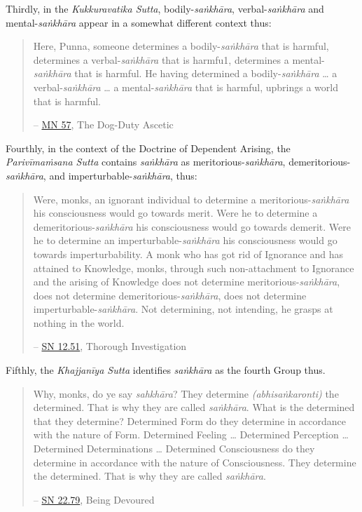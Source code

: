 Thirdly, in the \emph{Kukkuravatika Sutta}, bodily-\emph{saṅkhāra}, verbal-\emph{saṅkhāra} and mental-\emph{saṅkhāra} appear in a somewhat different context thus:

\begin{quote}
Here, Punna, someone determines a bodily-\emph{saṅkhāra} that is harmful, determines a verbal-\emph{saṅkhāra} that is harmfu1, determines a mental-\emph{saṅkhāra} that is harmful. He having determined a bodily-\emph{saṅkhāra} \ldots{} a verbal-\emph{saṅkhāra} \ldots{} a mental-\emph{saṅkhāra} that is harmful, upbrings a world that is harmful.

 -- \href{https://suttacentral.net/mn57/en/bodhi}{MN 57}, The Dog-Duty Ascetic
\end{quote}

Fourthly, in the context of the Doctrine of Dependent Arising, the \emph{Parivīmaṁsana Sutta} contains \emph{saṅkhāra} as meritorious-\emph{saṅkhāra}, demeritorious-\emph{saṅkhāra}, and imperturbable-\emph{saṅkhāra}, thus:

\begin{quote}
Were, monks, an ignorant individual to determine a meritorious-\emph{saṅkhāra} his consciousness would go towards merit. Were he to determine a demeritorious-\emph{saṅkhāra} his consciousness would go towards demerit. Were he to determine an imperturbable-\emph{saṅkhāra} his consciousness would go towards imperturbability. A monk who has got rid of Ignorance and has attained to Knowledge, monks, through such non-attachment to Ignorance and the arising of Knowledge does not determine meritorious-\emph{saṅkhāra}, does not determine demeritorious-\emph{saṅkhāra}, does not determine imperturbable-\emph{saṅkhāra}. Not determining, not intending, he grasps at nothing in the world.

 -- \href{https://suttacentral.net/sn12.51/en/sujato}{SN 12.51}, Thorough Investigation
\end{quote}

Fifthly, the \emph{Khajjanīya Sutta} identifies \emph{saṅkhāra} as the fourth Group thus.

\begin{quote}
Why, monks, do ye say \emph{sahkhāra}? They determine \emph{(abhisaṅkaronti)} the determined. That is why they are called \emph{saṅkhāra}. What is the determined that they determine? Determined Form do they determine in accordance with the nature of Form. Determined Feeling \ldots{} Determined Perception \ldots{} Determined Determinations \ldots{} Determined Consciousness do they determine in accordance with the nature of Consciousness. They determine the determined. That is why they are called \emph{saṅkhāra}.

 -- \href{https://suttacentral.net/sn22.79/en/bodhi}{SN 22.79}, Being Devoured
\end{quote}

